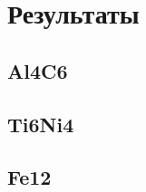 \chapter{Результаты}\label{ch:results}

\section{Al4C6}\label{sec:results/al4c6}

\section{Ti6Ni4}\label{sec:results/ti6ni4}

\section{Fe12}\label{sec:results/fe12}

\FloatBarrier
